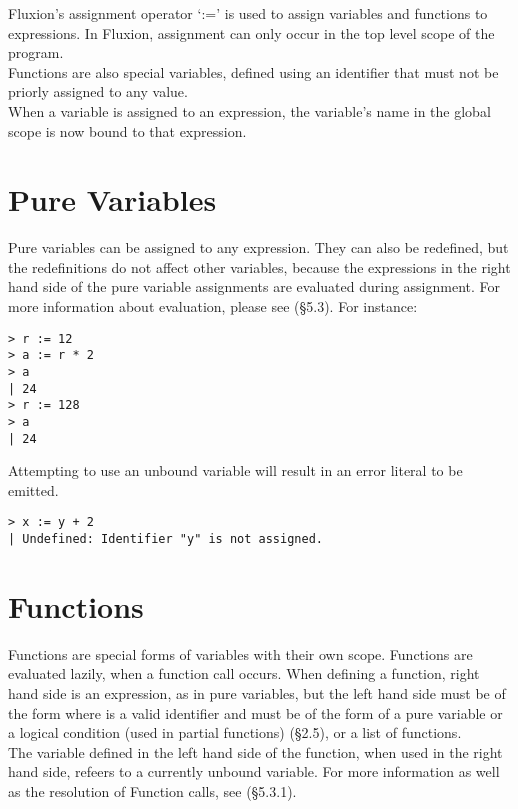 \documentclass[11pt,a4paper]{book}
\begin{document}
Fluxion's assignment operator `:=' is used to assign variables and functions to expressions. In Fluxion, assignment can only occur in the top level scope of the program. \\

Functions are also special variables, defined using an identifier that must not be priorly assigned to any value.\\

When a variable is assigned to an expression, the variable's name in the global scope is now bound to that expression.

\section{Pure Variables}

Pure variables can be assigned to any expression. They can also be redefined, but the redefinitions do not affect other variables, because the expressions in the right hand side of the pure variable assignments are evaluated during assignment. For more information about evaluation, please see (\S 5.3). For instance:

\begin{lstlisting}
> r := 12
> a := r * 2
> a
| 24
> r := 128
> a
| 24
\end{lstlisting}

Attempting to use an unbound variable will result in an  error literal to be emitted.

\begin{lstlisting}
> x := y + 2
| Undefined: Identifier "y" is not assigned.
\end{lstlisting}

\section{Functions}
Functions are special forms of variables with their own scope. Functions are evaluated lazily, when a function call occurs. When defining a function, right hand side is an expression, as in pure variables, but the left hand side must be of the form  where  is a valid identifier and  must be of the form of a pure variable or a logical condition (used in partial functions) (\S 2.5), or a list of functions. \\

The variable defined in the left hand side of the function, when used in the right hand side, refeers to a currently unbound variable. For more information as well as the resolution of Function calls, see (\S 5.3.1). \\
\end{document}
